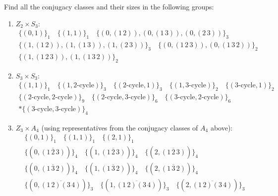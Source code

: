 \documentclass{article}
\begin{document}
Find all the conjugacy classes and their sizes in the following groups:
\begin{enumerate}[label=(\alph*), itemsep=0em]
    \item $Z_2 \times S_3$:
        \begin{gather*}
            \{ (0, 1) \}_1 \hspace{1em} \{ (1, 1) \}_1 \hspace{1em} \{ (0, (1\, 2)), (0, (1\, 3)), (0, (2\, 3)) \}_3 \\ \{ (1, (1\, 2)), (1, (1\, 3)), (1, (2\, 3)) \}_3 \hspace{1em} \{ (0, (1\, 2\, 3)), (0, (1\, 3\, 2)) \}_2 \\ \{ (1, (1\, 2\, 3)), (1, (1\, 3\, 2)) \}_2
        \end{gather*}
    \item $S_3 \times S_3$:
        \begin{gather*}
            \{ (1, 1) \}_1 \hspace{1em} \{ (1, \text{2-cycle}) \}_3 \hspace{1em} \{ (\text{2-cycle}, 1) \}_3 \hspace{1em} \{ (1, \text{3-cycle}) \}_2 \hspace{1em} \{ (\text{3-cycle}, 1) \}_2 \\
            \{ (\text{2-cycle}, \text{2-cycle}) \}_9 \hspace{1em} \{ (\text{2-cycle}, \text{3-cycle}) \}_6 \hspace{1em} \{ (\text{3-cycle}, \text{2-cycle}) \}_6 \\* \{ (\text{3-cycle}, \text{3-cycle}) \}_4
        \end{gather*}
    \item $Z_3 \times A_4$ (using representatives from the conjugacy classes of $A_4$ above):
        \begin{gather*}
            \{ (0, 1) \}_1 \hspace{1em} \{ (1, 1) \}_1 \hspace{1em} \{ (2, 1) \}_1 \\
            \{ (0, \overline{(1\, 2\, 3)}) \}_4 \hspace{1em} \{ (1, \overline{(1\, 2\, 3)}) \}_4 \hspace{1em} \{ (2, \overline{(1\, 2\, 3)}) \}_4 \\
            \{ (0, \overline{(1\, 3\, 2)}) \}_4 \hspace{1em} \{ (1, \overline{(1\, 3\, 2)}) \}_4 \hspace{1em} \{ (2, \overline{(1\, 3\, 2)}) \}_4 \\
            \{ (0, \overline{(1\, 2)(3\, 4)}) \}_3 \hspace{1em} \{ (1, \overline{(1\, 2)(3\, 4)}) \}_3 \hspace{1em} \{ (2, \overline{(1\, 2)(3\, 4)}) \}_3
        \end{gather*}
\end{enumerate}
\end{document}
